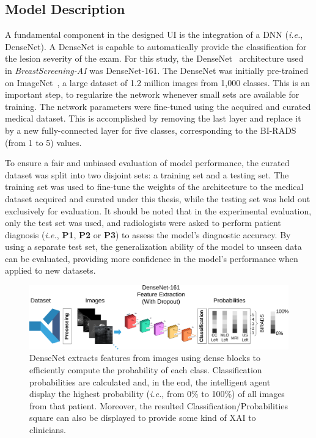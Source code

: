 \subsection{Model Description}
\label{sec:app002003005}

A fundamental component in the designed \ac{UI} is the integration of a \ac{DNN} ({\it i.e.}, DenseNet).
A DenseNet is capable to automatically provide the classification for the lesion severity of the exam.
For this study, the DenseNet~\cite{Huang_2017_CVPR} architecture used in {\it BreastScreening-AI} was DenseNet-161.
The DenseNet was initially pre-trained on ImageNet~\cite{10.1145/3351095.3375709}, a large dataset of 1.2 million images from 1,000 classes.
This is an important step, to regularize the network whenever small sets are available for training.
The network parameters were fine-tuned using the acquired and curated medical dataset.
This is accomplished by removing the last layer and replace it by a new fully-connected layer for five classes, corresponding to the \ac{BI-RADS} (from 1 to 5) values.

To ensure a fair and unbiased evaluation of model performance, the curated dataset was split into two disjoint sets: a training set and a testing set.
The training set was used to fine-tune the weights of the architecture to the medical dataset acquired and curated under this thesis, while the testing set was held out exclusively for evaluation.
It should be noted that in the experimental evaluation, only the test set was used, and radiologists were asked to perform patient diagnosis ({\it i.e.}, {\bf P1}, {\bf P2} or {\bf P3}) to assess the model's diagnostic accuracy.
By using a separate test set, the generalization ability of the model to unseen data can be evaluated, providing more confidence in the model's performance when applied to new datasets.

\begin{figure}[htbp]
\centering
\includegraphics[width=\textwidth]{images/fig042}
\caption{DenseNet extracts features from images using dense blocks to efficiently compute the probability of each class. Classification probabilities are calculated and, in the end, the intelligent agent display the highest probability ({\it i.e.}, from 0\% to 100\%) of all images from that patient. Moreover, the resulted Classification/Probabilities square can also be displayed to provide some kind of XAI to clinicians.}
\label{fig:fig042}
\end{figure}

